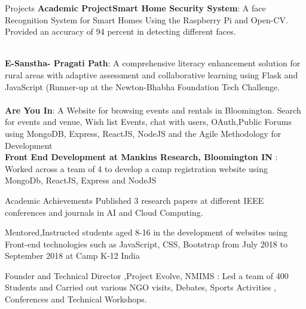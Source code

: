 \documentclass{resume} %
\begin{document}
\vspace{-5mm}
\begin{rSection}{Projects}
{\bf Academic ProjectSmart Home Security System}:
A face Recognition System for Smart Homes Using the Raspberry Pi and Open-CV. Provided an accuracy of 94 percent in detecting different faces.\\
\vspace{-5mm}

\\{\bf E-Sanstha- Pragati Path}:
 A comprehensive literacy enhancement solution for rural areas with adaptive assessment and collaborative learning using Flask and JavaScript (Runner-up at the Newton-Bhabha Foundation Tech Challenge.\\
\vspace{-5mm}
\\{\bf Are You In}:
 A Website for browsing events and rentals in Bloomington. Search for events and venue, Wish list Events, chat with users, OAuth,Public Forums  using MongoDB, Express, ReactJS, NodeJS and the Agile Methodology for Development
\\{\bf Front End Development at Mankins Research, Bloomington IN }:
Worked across a team of 4 to develop a camp registration website using MongoDb, ReactJS, Express and NodeJS

\end{rSection}

\vspace{-5mm}
\begin{rSection}{Academic Achievements} 
 Published 3 research papers at different IEEE conferences and journals in  AI and Cloud Computing. 
\item Mentored,Instructed students aged 8-16 in the development of websites using Front-end technologies such as JavaScript, CSS, Bootstrap from July 2018 to September 2018 at Camp K-12 India 
\item Founder and Technical Director ,Project Evolve, NMIMS : Led a team of 400 Students and
Carried out various NGO visits, Debates, Sports Activities , Conferences and Technical Workshops.

\end{rSection}

\newpage
\end{document}
